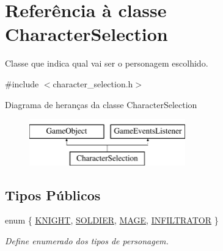 \hypertarget{classCharacterSelection}{}\section{Referência à classe Character\+Selection}
\label{classCharacterSelection}


Classe que indica qual vai ser o personagem escolhido.  




{\ttfamily \#include $<$character\+\_\+selection.\+h$>$}

Diagrama de heranças da classe Character\+Selection\begin{figure}[H]
\begin{center}
\leavevmode
\includegraphics[height=2.000000cm]{classCharacterSelection}
\end{center}
\end{figure}
\subsection*{Tipos Públicos}
\begin{DoxyCompactItemize}
\item 
enum \{ \mbox{\hyperlink{classCharacterSelection_a14b33a13e3498992faa7261e6f5e55caab23bc7eef25d502109e741d294b9939d}{K\+N\+I\+G\+HT}}, 
\mbox{\hyperlink{classCharacterSelection_a14b33a13e3498992faa7261e6f5e55caaab3e0766cab7dde8d3bf4b586eab764a}{S\+O\+L\+D\+I\+ER}}, 
\mbox{\hyperlink{classCharacterSelection_a14b33a13e3498992faa7261e6f5e55caa749e92b1c7efda5e21f6e3859f682093}{M\+A\+GE}}, 
\mbox{\hyperlink{classCharacterSelection_a14b33a13e3498992faa7261e6f5e55caa150d58b68f15c7b83527b4aa8d0cc449}{I\+N\+F\+I\+L\+T\+R\+A\+T\+OR}}
 \}
\begin{DoxyCompactList}\small\item\em Define enumerado dos tipos de personagem. \end{DoxyCompactList}\end{DoxyCompactItemize}
